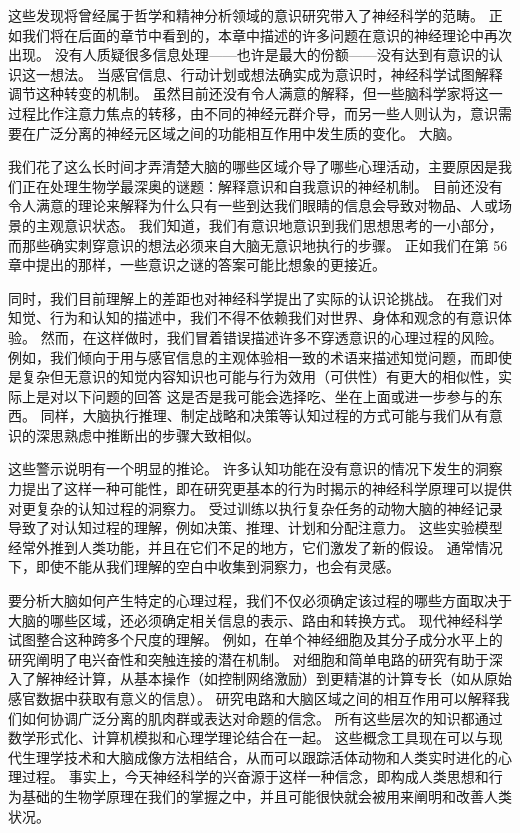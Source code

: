 这些发现将曾经属于哲学和精神分析领域的意识研究带入了神经科学的范畴。 
正如我们将在后面的章节中看到的，本章中描述的许多问题在意识的神经理论中再次出现。 
没有人质疑很多信息处理——也许是最大的份额——没有达到有意识的认识这一想法。 
当感官信息、行动计划或想法确实成为意识时，神经科学试图解释调节这种转变的机制。 
虽然目前还没有令人满意的解释，但一些脑科学家将这一过程比作注意力焦点的转移，由不同的神经元群介导，而另一些人则认为，意识需要在广泛分离的神经元区域之间的功能相互作用中发生质的变化。 大脑。


我们花了这么长时间才弄清楚大脑的哪些区域介导了哪些心理活动，主要原因是我们正在处理生物学最深奥的谜题：解释意识和自我意识的神经机制。 
目前还没有令人满意的理论来解释为什么只有一些到达我们眼睛的信息会导致对物品、人或场景的主观意识状态。 
我们知道，我们有意识地意识到我们思想思考的一小部分，而那些确实刺穿意识的想法必须来自大脑无意识地执行的步骤。 
正如我们在第 56 章中提出的那样，一些意识之谜的答案可能比想象的更接近。


同时，我们目前理解上的差距也对神经科学提出了实际的认识论挑战。 
在我们对知觉、行为和认知的描述中，我们不得不依赖我们对世界、身体和观念的有意识体验。 
然而，在这样做时，我们冒着错误描述许多不穿透意识的心理过程的风险。 
例如，我们倾向于用与感官信息的主观体验相一致的术语来描述知觉问题，而即使是复杂但无意识的知觉内容知识也可能与行为效用（可供性）有更大的相似性，实际上是对以下问题的回答 这是否是我可能会选择吃、坐在上面或进一步参与的东西。 
同样，大脑执行推理、制定战略和决策等认知过程的方式可能与我们从有意识的深思熟虑中推断出的步骤大致相似。


这些警示说明有一个明显的推论。 
许多认知功能在没有意识的情况下发生的洞察力提出了这样一种可能性，即在研究更基本的行为时揭示的神经科学原理可以提供对更复杂的认知过程的洞察力。 
受过训练以执行复杂任务的动物大脑的神经记录导致了对认知过程的理解，例如决策、推理、计划和分配注意力。 
这些实验模型经常外推到人类功能，并且在它们不足的地方，它们激发了新的假设。 
通常情况下，即使不能从我们理解的空白中收集到洞察力，也会有灵感。


要分析大脑如何产生特定的心理过程，我们不仅必须确定该过程的哪些方面取决于大脑的哪些区域，还必须确定相关信息的表示、路由和转换方式。 
现代神经科学试图整合这种跨多个尺度的理解。 
例如，在单个神经细胞及其分子成分水平上的研究阐明了电兴奋性和突触连接的潜在机制。 
对细胞和简单电路的研究有助于深入了解神经计算，从基本操作（如控制网络激励）到更精湛的计算专长（如从原始感官数据中获取有意义的信息）。 
研究电路和大脑区域之间的相互作用可以解释我们如何协调广泛分离的肌肉群或表达对命题的信念。 
所有这些层次的知识都通过数学形式化、计算机模拟和心理学理论结合在一起。 
这些概念工具现在可以与现代生理学技术和大脑成像方法相结合，从而可以跟踪活体动物和人类实时进化的心理过程。 
事实上，今天神经科学的兴奋源于这样一种信念，即构成人类思想和行为基础的生物学原理在我们的掌握之中，并且可能很快就会被用来阐明和改善人类状况。




